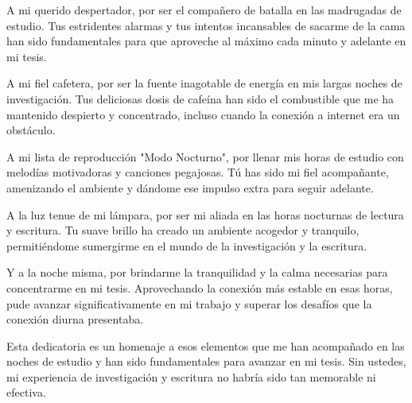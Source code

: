 \documentclass[
	spanish, %
	letterpaper, oneside
]{book}
\begin{document}
\begin{dedicatory}
    A mi querido despertador, por ser el compañero de batalla en las madrugadas de estudio. Tus estridentes alarmas y tus intentos incansables de sacarme de la cama han sido fundamentales para que aproveche al máximo cada minuto y adelante en mi tesis.

    A mi fiel cafetera, por ser la fuente inagotable de energía en mis largas noches de investigación. Tus deliciosas dosis de cafeína han sido el combustible que me ha mantenido despierto y concentrado, incluso cuando la conexión a internet era un obstáculo.

    A mi lista de reproducción "Modo Nocturno", por llenar mis horas de estudio con melodías motivadoras y canciones pegajosas. Tú has sido mi fiel acompañante, amenizando el ambiente y dándome ese impulso extra para seguir adelante.

    A la luz tenue de mi lámpara, por ser mi aliada en las horas nocturnas de lectura y escritura. Tu suave brillo ha creado un ambiente acogedor y tranquilo, permitiéndome sumergirme en el mundo de la investigación y la escritura.

    Y a la noche misma, por brindarme la tranquilidad y la calma necesarias para concentrarme en mi tesis. Aprovechando la conexión más estable en esas horas, pude avanzar significativamente en mi trabajo y superar los desafíos que la conexión diurna presentaba.

    Esta dedicatoria es un homenaje a esos elementos que me han acompañado en las noches de estudio y han sido fundamentales para avanzar en mi tesis. Sin ustedes, mi experiencia de investigación y escritura no habría sido tan memorable ni efectiva.
\end{dedicatory}
\end{document}
